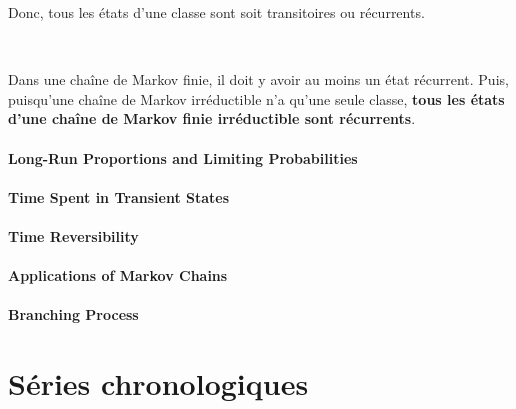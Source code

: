 \documentclass[10pt, french]{article}
\begin{document}
\begin{multicols*}{2}
Donc, tous les états d'une classe sont soit transitoires ou récurrents.

\
 
Dans une chaîne de Markov finie, il doit y avoir au moins un état récurrent. Puis, puisqu'une chaîne de Markov irréductible n'a qu'une seule classe, \textbf{tous les états d'une chaîne de Markov finie irréductible sont récurrents}.


\columnbreak
\subsection{Long-Run Proportions and Limiting Probabilities}


\columnbreak
\subsection{Time Spent in Transient States}


\columnbreak
\subsection{Time Reversibility}


\columnbreak
\subsection{Applications of Markov Chains}


\columnbreak
\subsection{Branching Process}





\pagebreak
\part{Séries chronologiques}
\label{chapt:seriesChrono}


\end{multicols*}
\end{document}
